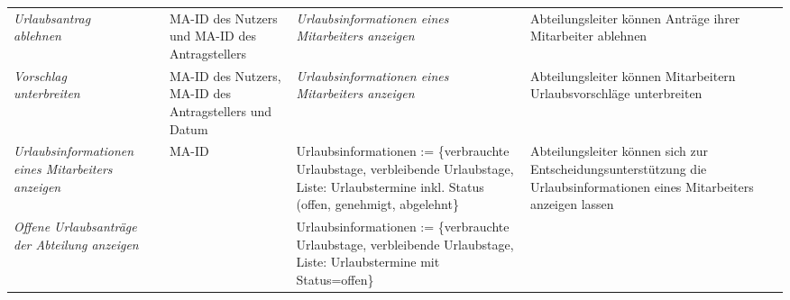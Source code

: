 {\begin{tabular}{|p{3cm}|p{4cm}|p{4cm}|p{4cm}|p{2cm}|}
	\cline{1-4}
		\textit{Urlaubsantrag \newline ablehnen} &
		MA-ID des Nutzers und MA-ID des Antragstellers &
		\textit{Urlaubsinformationen eines Mitarbeiters an\-zeigen} &
		Abteilungsleiter können Anträge ihrer Mitarbeiter ablehnen &
		\\
	\cline{1-4}
		\textit{Vorschlag \newline unterbreiten} &
		MA-ID des Nutzers, MA-ID des Antragstellers und \newline Datum &
		\textit{Urlaubsinformationen eines Mitarbeiters an\-zeigen} &
		Abteilungsleiter können Mitarbeitern Urlaubsvorschläge unterbreiten &
		\\
	\cline{1-4}
		\textit{Urlaubsinformationen eines Mitarbeiters an\-zeigen} &
		MA-ID &
		Urlaubsinformationen := \newline \{verbrauchte Urlaubstage, verbleibende Urlaubstage, Liste: Urlaubstermine inkl. Status (offen, genehmigt, abgelehnt\} &
		Abteilungsleiter können sich zur Entscheidungs\-unterstützung die Urlaubs\-informationen eines Mitarbeiters anzeigen lassen &
		\\
	\cline{1-4}
		\textit{Offene Urlaubsantr\"age der Abteilung anzeigen} &
		&
		Urlaubsinformationen := \newline \{verbrauchte Urlaubstage, verbleibende Urlaubstage, Liste: Urlaubstermine mit Status=offen\}  &
		&
		\\
	\hline
\end{tabular}
}

